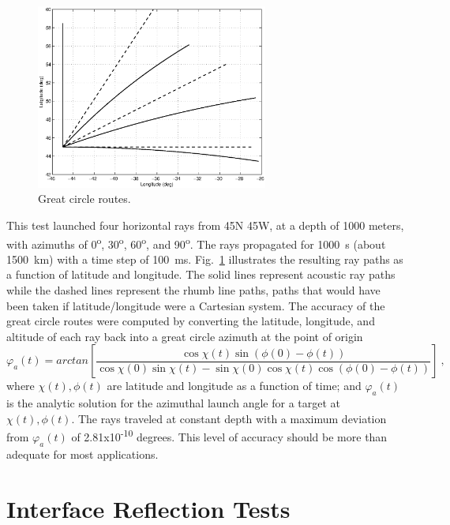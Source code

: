 \documentclass{ws-jca}
\begin{document}
\begin{figure}[th]
	\centerline{\includegraphics[width=3in]{refraction_great_circle.eps}} 
	\vspace*{8pt}
	\caption{Great circle routes. 
	\label{fig:gcroutes}}
\end{figure}
This test launched four horizontal rays from 45N 45W, at a depth of 1000
meters, with azimuths of 0\textsuperscript{o}, 30\textsuperscript{o},
60\textsuperscript{o}, and 90\textsuperscript{o}. The rays propagated for
1000~s (about 1500~km) with a time step of 100~ms.
Fig.~\ref{fig:gcroutes} illustrates the resulting ray paths as a function
of latitude and longitude. The solid lines represent acoustic ray paths
while the dashed lines represent the rhumb line paths, paths that would
have been taken if latitude/longitude were a Cartesian system. The accuracy
of the great circle routes were computed by converting the latitude,
longitude, and altitude of each ray back into a great circle azimuth at the
point of origin\cite{Williams2011}
\begin{equation}
	\varphi_a(t) = arctan \left[
		\frac{  \cos{\chi(t)} \sin(\phi(0)-\phi(t))}{ \cos{\chi(0)} \sin{\chi(t)}
		- \sin{\chi(0)} \cos{\chi(t)} \cos(\phi(0)-\phi(t)) } \right] \:,
	\label{eq:gc_bearing}
\end{equation}
where
\(\chi(t), \phi(t)\) are latitude and longitude as a function of time; and 
\(\varphi_a(t)\) is the analytic solution for the azimuthal launch angle
for a target at \(\chi(t), \phi(t)\).
The rays traveled at constant depth with a maximum deviation
from \(\varphi_a(t)\) of 2.81x10\textsuperscript{-10} degrees. This level of accuracy should be more than adequate for most applications.

\section{Interface Reflection Tests}
\end{document}
